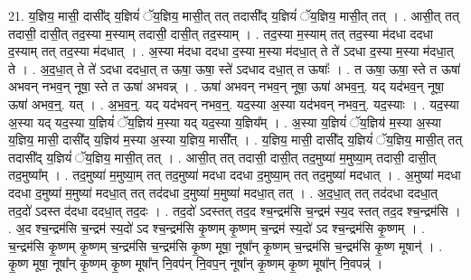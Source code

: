 \documentclass[17pt]{extarticle}
\begin{document}
21. य॒ज्ञिय॒ मासी॒ दासी᳚द् य॒ज्ञियं॑ ॅय॒ज्ञिय॒ मासी॒त् तत् तदासी᳚द् य॒ज्ञियं॑ ॅय॒ज्ञिय॒ मासी॒त् तत् । . आसी॒त् तत् तदासी॒ दासी॒त् तद॒स्या म॒स्याम् तदासी॒ दासी॒त् तद॒स्याम् । . तद॒स्या म॒स्याम् तत् तद॒स्या म॑दधा ददधा द॒स्याम् तत् तद॒स्या म॑दधात् । . अ॒स्या म॑दधा ददधा द॒स्या म॒स्या म॑दधा॒त् ते ते॑ ऽदधा द॒स्या म॒स्या म॑दधा॒त् ते । . अ॒द॒धा॒त् ते ते॑ ऽदधा ददधा॒त् त ऊषा॒ ऊषा॒ स्ते॑ ऽदधाद दधा॒त् त ऊषाः᳚ । . त ऊषा॒ ऊषा॒ स्ते त ऊषा॑ अभवन् नभव॒न् नूषा॒ स्ते त ऊषा॑ अभवन्न् । . ऊषा॑ अभवन् नभव॒न् नूषा॒ ऊषा॑ अभव॒न्॒. यद् यद॑भव॒न् नूषा॒ ऊषा॑ अभव॒न्॒. यत् । . अ॒भ॒व॒न्॒. यद् यद॑भवन् नभव॒न्॒. यद॒स्या अ॒स्या यद॑भवन् नभव॒न्॒. यद॒स्याः । . यद॒स्या अ॒स्या यद् यद॒स्या य॒ज्ञियं॑ ॅय॒ज्ञिय॑ म॒स्या यद् यद॒स्या य॒ज्ञिय᳚म् । . अ॒स्या य॒ज्ञियं॑ ॅय॒ज्ञिय॑ म॒स्या अ॒स्या य॒ज्ञिय॒ मासी॒ दासी᳚द् य॒ज्ञिय॑ म॒स्या अ॒स्या य॒ज्ञिय॒ मासी᳚त् । . य॒ज्ञिय॒ मासी॒ दासी᳚द् य॒ज्ञियं॑ ॅय॒ज्ञिय॒ मासी॒त् तत् तदासी᳚द् य॒ज्ञियं॑ ॅय॒ज्ञिय॒ मासी॒त् तत् । . आसी॒त् तत् तदासी॒ दासी॒त् तद॒मुष्या॑ म॒मुष्या॒म् तदासी॒ दासी॒त् तद॒मुष्या᳚म् । . तद॒मुष्या॑ म॒मुष्या॒म् तत् तद॒मुष्या॑ मदधा ददधा द॒मुष्या॒म् तत् तद॒मुष्या॑ मदधात् । . अ॒मुष्या॑ मदधा ददधा द॒मुष्या॑ म॒मुष्या॑ मदधा॒त् तत् तद॑दधा द॒मुष्या॑ म॒मुष्या॑ मदधा॒त् तत् । . अ॒द॒धा॒त् तत् तद॑दधा ददधा॒त् तद॒दो॑ ऽदस्त द॑दधा ददधा॒त् तद॒दः । . तद॒दो॑ ऽदस्तत् तद॒द श्च॒न्द्रम॑सि च॒न्द्रम॑ स्य॒द स्तत् तद॒द श्च॒न्द्रम॑सि । . अ॒द श्च॒न्द्रम॑सि च॒न्द्रम॑ स्य॒दो॑ ऽद श्च॒न्द्रम॑सि कृ॒ष्णम् कृ॒ष्णम् च॒न्द्रम॑ स्य॒दो॑ ऽद श्च॒न्द्रम॑सि कृ॒ष्णम् । . च॒न्द्रम॑सि कृ॒ष्णम् कृ॒ष्णम् च॒न्द्रम॑सि च॒न्द्रम॑सि कृ॒ष्ण मूषा॒ नूषा᳚न् कृ॒ष्णम् च॒न्द्रम॑सि च॒न्द्रम॑सि कृ॒ष्ण मूषान्॑ । . कृ॒ष्ण मूषा॒ नूषा᳚न् कृ॒ष्णम् कृ॒ष्ण मूषा᳚न् नि॒वप॑न् नि॒वप॒न् नूषा᳚न् कृ॒ष्णम् कृ॒ष्ण मूषा᳚न् नि॒वपन्न्॑ । \newline
\end{document}
